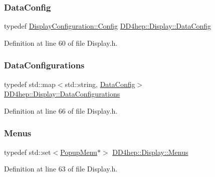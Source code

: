 \subsubsection{\texorpdfstring{Data\+Config}{DataConfig}}
{\footnotesize\ttfamily typedef \hyperlink{class_d_d4hep_1_1_display_configuration_1_1_config}{Display\+Configuration\+::\+Config} \hyperlink{class_d_d4hep_1_1_display_a79237f24a5b3ec781faa5f8e20579ae0}{D\+D4hep\+::\+Display\+::\+Data\+Config}}



Definition at line 60 of file Display.\+h.

\hypertarget{class_d_d4hep_1_1_display_a730a4516989abe8b2f788c8f957e0633}{}\label{class_d_d4hep_1_1_display_a730a4516989abe8b2f788c8f957e0633} 
\subsubsection{\texorpdfstring{Data\+Configurations}{DataConfigurations}}
{\footnotesize\ttfamily typedef std\+::map$<$std\+::string, \hyperlink{class_d_d4hep_1_1_display_a79237f24a5b3ec781faa5f8e20579ae0}{Data\+Config}$>$ \hyperlink{class_d_d4hep_1_1_display_a730a4516989abe8b2f788c8f957e0633}{D\+D4hep\+::\+Display\+::\+Data\+Configurations}}



Definition at line 66 of file Display.\+h.

\hypertarget{class_d_d4hep_1_1_display_a4dbc259bd581b56802ef3c29b72909be}{}\label{class_d_d4hep_1_1_display_a4dbc259bd581b56802ef3c29b72909be} 
\subsubsection{\texorpdfstring{Menus}{Menus}}
{\footnotesize\ttfamily typedef std\+::set$<$\hyperlink{class_d_d4hep_1_1_popup_menu}{Popup\+Menu}$\ast$$>$ \hyperlink{class_d_d4hep_1_1_display_a4dbc259bd581b56802ef3c29b72909be}{D\+D4hep\+::\+Display\+::\+Menus}}



Definition at line 63 of file Display.\+h.

\hypertarget{class_d_d4hep_1_1_display_ab7cf442eb2211f57f55b7cd1cf8a61c1}{}\label{class_d_d4hep_1_1_display_ab7cf442eb2211f57f55b7cd1cf8a61c1} 
